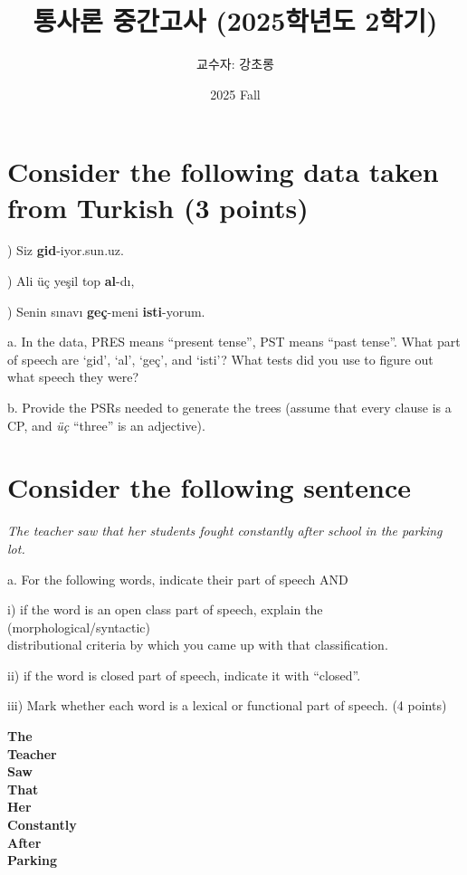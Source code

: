 \documentclass{article}
\begin{document}
\large

\title{통사론 중간고사 (2025학년도 2학기)}
\author{교수자: 강초롱}
\date{2025 Fall}
\maketitle
\thispagestyle{fancy}
\bigskip

\section{Consider the following data taken from Turkish \normalsize(3 points)}
\medskip {}) Siz \textbf{gid}-iyor.sun.uz.\par 
{}) Ali \"{u}\c{c} ye\c{s}il top \textbf{al}-d\i,\par
{}) Senin s\i{}nav\i{} \textbf{ge\c{c}}-meni \textbf{isti}-yorum.\par
\bigskip
\noindent a. In the data, PRES means ``present tense'', PST means ``past tense''. 
What part of speech are `gid', `al', `ge\c{c}', and `isti'? 
What tests did you use to figure out what speech they were? \par
\vspace{1cm}
\noindent b. Provide the PSRs needed to generate the trees (assume that every clause is a CP, and \textit{\"{u}\c{c}} ``three'' is an adjective). \par
\vspace{1cm}

\section{Consider the following sentence \normalsize}
\textit{The teacher saw that her students fought constantly after school in the parking lot.} \par
\bigskip
\noindent a. For the following words, indicate their part of speech AND \par
\medskip \noindent i) if the word is an open class part of speech, explain the (morphological/syntactic)\\ distributional criteria by which you came up with that classification.\par
\noindent ii) if the word is closed part of speech, indicate it with ``closed''.\par
\noindent iii) Mark whether each word is a lexical or functional part of speech. (4 points) \par
\begin{description}
    \item[\textbf{The}]
    \item[\textbf{Teacher}] 
    \item[\textbf{Saw}] 
    \item[\textbf{That}] 
    \item[\textbf{Her}] 
    \item[\textbf{Constantly}]
    \item[\textbf{After}]
    \item[\textbf{Parking}]   
\end{description}
\end{document}
